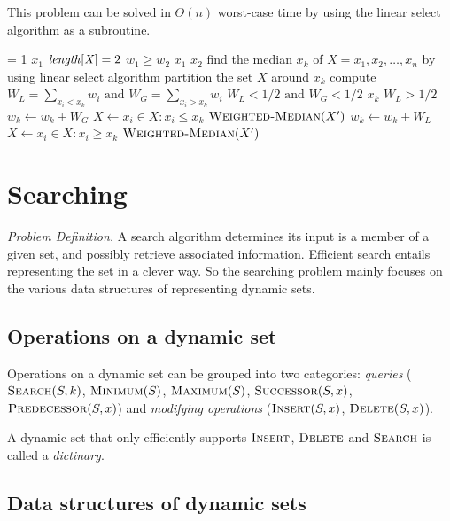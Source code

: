 \documentclass[12pt]{article}
\begin{document}
This problem can be solved in $\Theta(n)$ worst-case time by using the linear
select algorithm as a subroutine.

\begin{codebox}
\li \If {} = 1
\li     \Then \Return $x_1$
\li \ElseIf $\id{length[X]} = 2$
\li     \Then \If $w_1 \geq w_2$
\li             \Then \Return $x_1$
\li             \Else \Return $x_2$
                \End
\li \ElseNoIf
\li     find the median $x_k$ of $X = {x_1, x_2, \ldots, x_n}$ by using
            linear select algorithm
\li     partition the set $X$ around $x_k$
\li     compute $W_L = \sum_{x_i < x_k} w_i \mbox{ and } W_G = \sum_{x_i > x_k} w_i$
\li     \If $W_L < 1/2 \mbox{ and } W_G < 1/2$
\li         \Then \Return $x_k$
\li     \ElseIf $W_L > 1/2$
\li         \Then $w_k \gets w_k + W_G$
\li             $X \gets {x_i \in X: x_i \leq x_k}$
\li             \Return $\textnormal{\scshape Weighted-Median}(X')$
\li     \ElseNoIf $w_k \gets w_k + W_L$
\li         $X \gets {x_i \in X: x_i \geq x_k}$
\li         \Return $\textnormal{\scshape Weighted-Median}(X')$
        \End
    \End
\end{codebox}

\section{Searching}

\emph{Problem Definition.}
    A search algorithm determines its input is a member of a given set, and
    possibly retrieve associated information.  Efficient search entails
    representing the set in a clever way.  So the searching problem mainly
    focuses on the various data structures of representing dynamic sets.

\subsection{Operations on a dynamic set}

Operations on a dynamic set can be grouped into two categories: 
{\em queries} ($\textnormal{\scshape Search}(S,k)$,  $\textnormal{\scshape Minimum}(S)$, $\textnormal{\scshape Maximum}(S)$,
$\textnormal{\scshape Successor}(S,x)$, $\textnormal{\scshape Predecessor}(S,x)$) and 
{\em modifying operations} ($\textnormal{\scshape Insert}(S, x)$, $\textnormal{\scshape Delete}(S,x)$).

A dynamic set that only efficiently supports $\textnormal{\scshape Insert}$,
  $\textnormal{\scshape Delete}$ and $\textnormal{\scshape Search}$ is called a {\em dictinary}.

\subsection{Data structures of dynamic sets}
\end{document}
